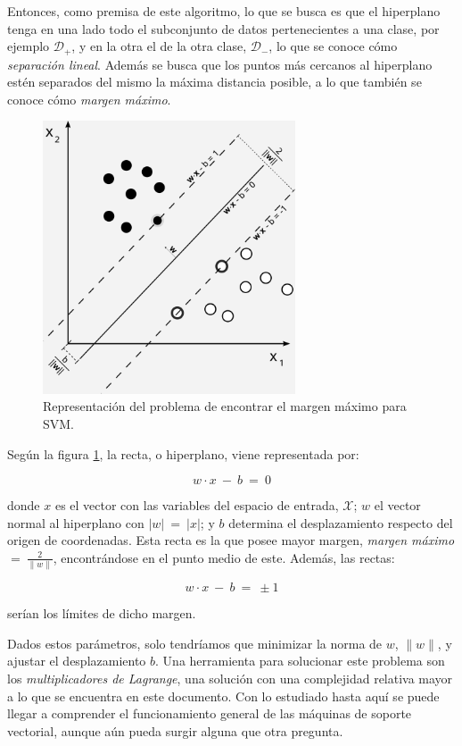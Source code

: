 Entonces, como premisa de este algoritmo, lo que se busca es que el hiperplano tenga en una lado todo el subconjunto de datos pertenecientes a una clase, por ejemplo $\mathcal{D}_{+}$, y en la otra el de la otra clase, $\mathcal{D}_{-}$, lo que se conoce cómo \emph{separación lineal}. Además se busca que los puntos más cercanos al hiperplano estén separados del mismo la máxima distancia posible, a lo que también se conoce cómo \emph{margen máximo}.

\begin{figure}[ht]
  \centering
  \includegraphics[width=75mm]{figures/ch_03/svm_margin.png}
  \caption{Representación del problema de encontrar el margen máximo para SVM. \cite{wikipedia2014support}}
  \label{fig:3.2}
\end{figure}

Según la figura \ref{fig:3.2}, la recta, o hiperplano, viene representada por:

$$
w \cdot x\:-\:b\:=\:0
$$

\noindent
donde $x$ es el vector con las variables del espacio de entrada, $\mathcal{X}$; $w$ el vector normal al hiperplano con $|w|\:=\:|x|$; y $b$ determina el desplazamiento respecto del origen de coordenadas. Esta recta es la que posee mayor margen, \emph{margen máximo} $=\:\frac{2}{\lVert w \rVert}$, encontrándose en el punto medio de este. Además, las rectas:

$$
w \cdot x\:-\:b\:=\:\pm1
$$

\noindent
serían los límites de dicho margen.

Dados estos parámetros, solo tendríamos que minimizar la norma de $w$, $\lVert w \rVert$, y ajustar el desplazamiento $b$. Una herramienta para solucionar este problema son los \emph{multiplicadores de Lagrange}, una solución con una complejidad relativa mayor a lo que se encuentra en este documento. Con lo estudiado hasta aquí se puede llegar a comprender el funcionamiento general de las máquinas de soporte vectorial, aunque aún pueda surgir alguna que otra pregunta.

